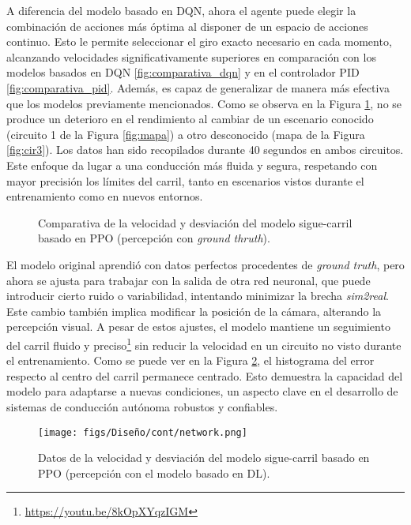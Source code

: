 A diferencia del modelo basado en \ac{DQN}, ahora el agente puede elegir la combinación de acciones más óptima al disponer de un espacio de acciones continuo. Esto le permite seleccionar el giro exacto necesario en cada momento, alcanzando velocidades significativamente superiores en comparación con los modelos basados en \ac{DQN} \ref{fig:comparativa_dqn} y en el controlador \ac{PID} \ref{fig:comparativa_pid}. Además, es capaz de generalizar de manera más efectiva que los modelos previamente mencionados. Como se observa en la Figura \ref{fig:comparativa_ppo}, no se produce un deterioro en el rendimiento al cambiar de un escenario conocido (circuito 1 de la Figura \ref{fig:mapa}) a otro desconocido (mapa de la Figura \ref{fig:cir3}). Los datos han sido recopilados durante 40 segundos en ambos circuitos. Este enfoque da lugar a una conducción más fluida y segura, respetando con mayor precisión los límites del carril, tanto en escenarios vistos durante el entrenamiento como en nuevos entornos.

\begin{figure}[ht]
\centering
{}
\hfill
{}
\caption{Comparativa de la velocidad y desviación del modelo sigue-carril basado en \ac{PPO} (percepción con \textit{ground thruth}).}
\label{fig:comparativa_ppo}
\end{figure}

\newpage

El modelo original aprendió con datos perfectos procedentes de \textit{ground truth}, pero ahora se ajusta para trabajar con la salida de otra red neuronal, que puede introducir cierto ruido o variabilidad, intentando minimizar la brecha \textit{sim2real}. Este cambio también implica modificar la posición de la cámara, alterando la percepción visual. A pesar de estos ajustes, el modelo mantiene un seguimiento del carril fluido y preciso\footnote{\url{https://youtu.be/8kOpXYqzIGM}} sin reducir la velocidad en un circuito no visto durante el entrenamiento. Como se puede ver en la Figura \ref{fig:network_ppo_carril}, el histograma del error respecto al centro del carril permanece centrado. Esto demuestra la capacidad del modelo para adaptarse a nuevas condiciones, un aspecto clave en el desarrollo de sistemas de conducción autónoma robustos y confiables. 
\begin{figure}[ht]
\centering
\texttt{[image: figs/Diseño/cont/network.png]}
\caption{Datos de la velocidad y desviación del modelo sigue-carril basado en \ac{PPO} (percepción con el modelo basado en \ac{DL}). }
\label{fig:network_ppo_carril}
\end{figure}


